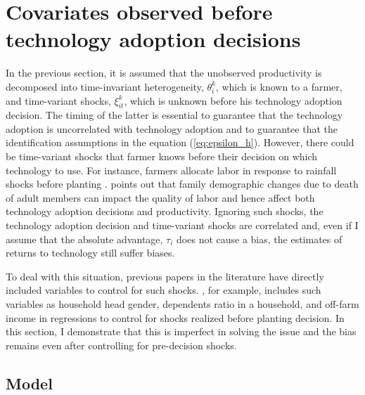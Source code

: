 \documentclass[11pt,letterpaper]{article}
\begin{document}
\section{Covariates observed before technology adoption decisions}\label{sec:covar}

In the previous section, it is assumed that the unobserved productivity is decomposed into time-invariant heterogeneity, $\theta_i^k$, which is known to a farmer, and time-variant shocks, $\xi_{it}^k$, which is unknown before his technology adoption decision.
The timing of the latter is essential to guarantee that the technology adoption is uncorrelated with technology adoption and to guarantee that the identification assumptions in the equation (\ref{eq:epsilon_h}).
However, there could be time-variant shocks that farmer knows before their decision on which technology to use.
For instance, farmers allocate labor in response to rainfall shocks before planting \citep{fafchamps1993sequential}.
\citet{Suri11} points out that family demographic changes due to death of adult members can impact the quality of labor and hence affect both technology adoption decisions and productivity.
Ignoring such shocks, the technology adoption decision and time-variant shocks are correlated and, even if I assume that the absolute advantage, $\tau_i$ does not cause a bias, the estimates of returns to technology still suffer biases.

To deal with this situation, previous papers in the literature have directly included variables to control for such shocks.
\citet{Michler2019}, for example, includes such variables as household head gender, dependents ratio in a household, and off-farm income in regressions to control for shocks realized before planting decision.
In this section, I demonstrate that this is imperfect in solving the issue and the bias remains even after controlling for pre-decision shocks.

\subsection{Model}
\end{document}
